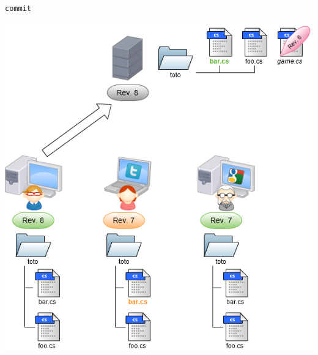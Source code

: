 \begin{frame}
  \texttt{commit}
  \begin{center}
    \vspace{-12pt}
    \includegraphics[scale=0.3]{images/13-Commit4.png}
  \end{center}
\end{frame}

